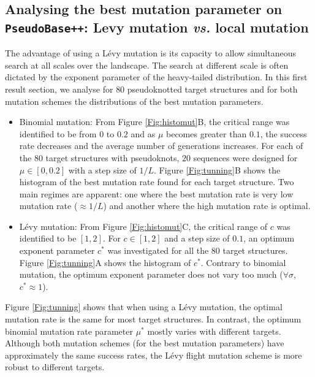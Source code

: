 \subsection{Analysing the best mutation parameter on \texttt{PseudoBase++}: Levy mutation \emph{vs.} local mutation}
The advantage of using a Lévy mutation is its capacity to allow simultaneous search at all scales over the landscape. The search at different scale is often dictated by the exponent parameter of the heavy-tailed distribution. In this first result section, we analyse for $80$ pseudoknotted target structures and for both mutation schemes the distributions of the best mutation parameters.
\begin{itemize}
	\item Binomial mutation: From Figure \ref{Fig:histomut}B, the critical range was identified to be from $0$ to $0.2$ and as $\mu$ becomes greater than $0.1$, the success rate decreases and the average number of generations increases. For each of the $80$ target structures with pseudoknots, $20$ sequences were designed for $\mu \in [0,0.2]$ with a step size of $1/L$. Figure \ref{Fig:tunning}B shows the histogram of the best mutation rate found for each target structure. Two main regimes are apparent: one where the best mutation rate is very low mutation rate ($\approx 1/L$) and another where the high mutation rate is optimal.
	
	\item Lévy mutation: From Figure \ref{Fig:histomut}C, the critical range of $c$ was identified to be $[1,2]$. For $c \in [1,2]$ and a step size of $0.1$, an optimum exponent parameter $c^*$ was investigated for all the $80$ target structures. Figure \ref{Fig:tunning}A shows the histogram of $c^*$. Contrary to binomial mutation, the optimum exponent parameter does not vary too much ($\forall \sigma$, $c^*\approx 1$).
\end{itemize}
Figure \ref{Fig:tunning} shows that when using a Lévy mutation, the optimal mutation rate is the same for most target structures. In contrast, the optimum binomial mutation rate parameter $\mu^*$ mostly varies with different targets. Although both mutation schemes (for the best mutation parameters) have approximately the same success rates, the Lévy flight mutation scheme is more robust to different targets. %

